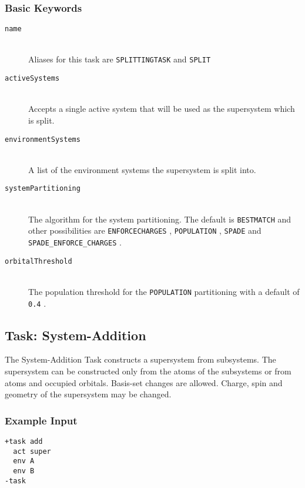 \documentclass[bibliography=totocnumbered,a4paper,10pt,oneside]{scrbook}
\newcommand{\ttt}[1]{%
  \begingroup\setlength{\fboxsep}{1pt}%
  \colorbox{serenity-green!30}{\texttt{\hspace*{2pt}\vphantom{(g}#1\hspace*{2pt}}}%
  \endgroup
}
\begin{document}
\subsubsection{Basic Keywords}
\begin{description}
	\item[\texttt{name}]\hfill \\
	Aliases for this task are \ttt{SPLITTINGTASK} and \ttt{SPLIT}
	\item[\texttt{activeSystems}]\hfill \\
	Accepts a single active system that will be used as the supersystem which is split.
	\item[\texttt{environmentSystems}]\hfill \\
	A list of the environment systems the supersystem is split into.
	\item[\texttt{systemPartitioning}]\hfill \\
	The algorithm for the system partitioning. The default is \ttt{BESTMATCH} and other possibilities are \ttt{ENFORCECHARGES}, \ttt{POPULATION}, \ttt{SPADE} and  \ttt{SPADE\_ENFORCE\_CHARGES}.
	\item[\texttt{orbitalThreshold}]\hfill \\
	The population threshold for the \ttt{POPULATION} partitioning with a default of \ttt{0.4}.
\end{description}

\subsection{Task: System-Addition}\label{task: addition}
The System-Addition Task constructs a supersystem from subsystems. The supersystem can be constructed only from the atoms of the subsystems or from atoms and occupied orbitals. Basis-set changes are allowed. Charge, spin and geometry of the supersystem may be changed.
\subsubsection{Example Input}
\begin{lstlisting}
+task add
  act super
  env A
  env B
-task
\end{lstlisting}
\end{document}
